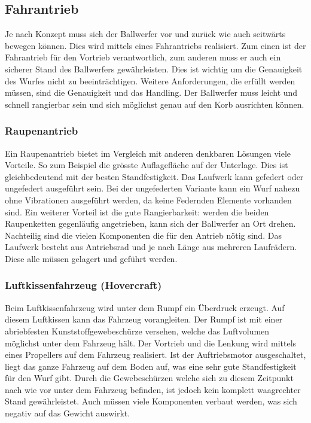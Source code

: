 \subsection{Fahrantrieb}
Je nach Konzept muss sich der Ballwerfer vor und zurück wie auch seitwärts bewegen können. Dies wird mittels eines Fahrantriebs realisiert. Zum einen ist der Fahrantrieb für den Vortrieb verantwortlich, zum anderen muss er auch ein sicherer Stand des Ballwerfers gewährleisten. Dies ist wichtig um die Genauigkeit des Wurfes nicht zu beeinträchtigen. Weitere Anforderungen, die erfüllt werden müssen, sind die Genauigkeit und das Handling. Der Ballwerfer muss leicht und schnell rangierbar sein und sich möglichst genau auf den Korb ausrichten können. 

\subsubsection{Raupenantrieb}
Ein Raupenantrieb bietet im Vergleich mit anderen denkbaren Lösungen viele Vorteile. So zum Beispiel die grösste Auflagefläche auf der Unterlage. Dies ist gleichbedeutend mit der besten Standfestigkeit. Das Laufwerk kann gefedert oder ungefedert ausgeführt sein. Bei der ungefederten Variante kann ein Wurf nahezu ohne Vibrationen ausgeführt werden, da keine Federnden Elemente vorhanden sind. Ein weiterer Vorteil ist die gute Rangierbarkeit: werden die beiden Raupenketten gegenläufig angetrieben, kann sich der Ballwerfer an Ort drehen. Nachteilig sind die vielen Komponenten die für den Antrieb nötig sind. Das Laufwerk besteht aus Antriebsrad und je nach Länge aus mehreren Laufrädern. Diese alle müssen gelagert und geführt werden. 
 
\subsubsection{Luftkissenfahrzeug (Hovercraft)}
Beim Luftkissenfahrzeug wird unter dem Rumpf ein Überdruck erzeugt. Auf diesem Luftkissen kann das Fahrzeug vorangleiten. Der Rumpf ist mit einer abriebfesten Kunststoffgewebeschürze versehen, welche das Luftvolumen möglichst unter dem Fahrzeug hält. Der Vortrieb und die Lenkung wird mittels eines Propellers auf dem Fahrzeug realisiert. Ist der Auftriebsmotor ausgeschaltet, liegt das ganze Fahrzeug auf dem Boden auf, was eine sehr gute Standfestigkeit für den Wurf gibt. Durch die Gewebeschürzen welche sich zu diesem Zeitpunkt nach wie vor unter dem Fahrzeug befinden, ist jedoch kein komplett waagrechter Stand gewährleistet. Auch müssen viele Komponenten verbaut werden, was sich negativ auf das Gewicht auswirkt.

